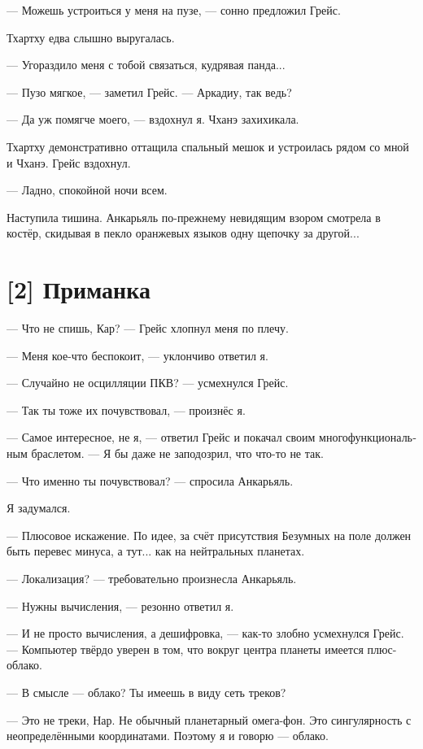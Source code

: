 \documentclass[a4paper,12pt,fleqn]{book}\usepackage{cooltooltips}\usepackage{polyglossia}\setdefaultlanguage[babelshorthands=true]{russian}\setotherlanguage{english}\defaultfontfeatures{Ligatures=TeX,Mapping=tex-text} \usepackage{xcolor}\definecolor{lightgray}{HTML}{bbbbbb}\color{lightgray}\newcommand{\ml}[3]{\textenglish{\textcolor{black}{#3}}}
\begin{document}
{--- Можешь устроиться у меня на пузе, --- сонно предложил Грейс.

Тхартху едва слышно выругалась.

--- Угораздило меня с тобой связаться, кудрявая панда...

--- Пузо мягкое, --- заметил Грейс.
--- Аркадиу, так ведь?

--- Да уж помягче моего, --- вздохнул я.
Чханэ захихикала.

Тхартху демонстративно оттащила спальный мешок и устроилась рядом со мной и Чханэ.
Грейс вздохнул.

--- Ладно, спокойной ночи всем.

Наступила тишина.
Анкарьяль по-прежнему невидящим взором смотрела в костёр, скидывая в пекло оранжевых языков одну щепочку за другой...

\section{[2] Приманка}

--- Что не спишь, Кар? --- Грейс хлопнул меня по плечу.

--- Меня кое-что беспокоит, --- уклончиво ответил я.

--- Случайно не осцилляции ПКВ? --- усмехнулся Грейс.

--- Так ты тоже их почувствовал, --- произнёс я.

--- Самое интересное, не я, --- ответил Грейс и покачал своим многофункциональным браслетом.
--- Я бы даже не заподозрил, что что-то не так.

--- Что именно ты почувствовал? --- спросила Анкарьяль.

Я задумался.

--- Плюсовое искажение.
По идее, за счёт присутствия Безумных на поле должен быть перевес минуса, а тут... как на нейтральных планетах.

--- Локализация? --- требовательно произнесла Анкарьяль.

--- Нужны вычисления, --- резонно ответил я.

--- И не просто вычисления, а дешифровка, --- как-то злобно усмехнулся Грейс.
--- Компьютер твёрдо уверен в том, что вокруг центра планеты имеется плюс-облако.

--- В смысле --- облако?
Ты имеешь в виду сеть треков?

--- Это не треки, Нар.
Не обычный планетарный омега-фон.
Это сингулярность с неопределёнными координатами.
Поэтому я и говорю --- облако.

}
\end{document}

